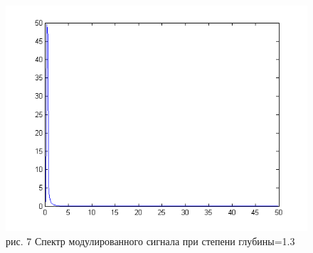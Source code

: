 \documentclass[10pt,a4paper]{report}
\begin{document}
\begin{figure}
\begin{center}
\includegraphics[angle=0, scale = 0.8]{1_7.png}\newline
рис. 7  Спектр модулированного сигнала при степени глубины=1.3\newline
\end{center}
\end{figure}
\end{document}
